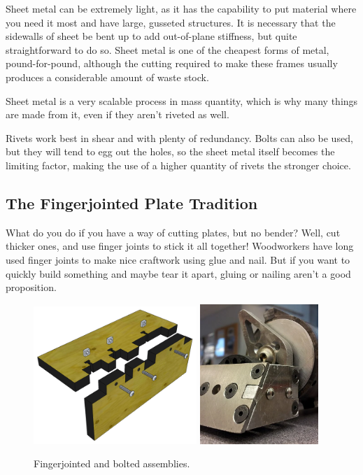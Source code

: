 \documentclass[10pt,letterpaper]{book}
\begin{document}
	Sheet metal can be extremely light, as it has the capability to put material where you need it most and have large, gusseted structures. It is necessary that the sidewalls of sheet be bent up to add out-of-plane stiffness, but quite straightforward to do so. Sheet metal is one of the cheapest forms of metal, pound-for-pound, although the cutting required to make these frames usually produces a considerable amount of waste stock. 
	
	Sheet metal is a very scalable process in mass quantity, which is why many things are made from it, even if they aren't riveted as well.
	
	Rivets work best in shear and with plenty of redundancy. Bolts can also be used, but they will tend to egg out the holes, so the sheet metal itself becomes the limiting factor, making the use of a higher quantity of rivets the stronger choice.
	
	\subsection{The Fingerjointed Plate Tradition}
	What do you do if you have a way of cutting plates, but no bender? Well, cut thicker ones, and use finger joints to stick it all together! Woodworkers have long used finger joints to make nice craftwork using glue and nail. But if you want to quickly build something and maybe tear it apart, gluing or nailing aren't a good proposition.
	
	\begin{figure}[H]
		\includegraphics[width=0.55\textwidth]{imgs/tradition_fingerjoint.png}
		\includegraphics[width=0.4\textwidth]{imgs/fingerjoint_battlebot.png}
		\caption{Fingerjointed and bolted assemblies.}
	\end{figure}
	
\end{document}
